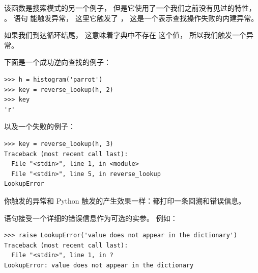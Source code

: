 该函数是搜索模式的另一个例子， 但是它使用了一个我们之前没有见过的特性， 。    语句 能触发异常， 这里它触发了 ， 这是一个表示查找操作失败的内建异常。

  
 
 


如果我们到达循环结尾， 这意味着字典中不存在  这个值， 所以我们触发一个异常。


下面是一个成功逆向查找的例子：

\begin{lstlisting}
>>> h = histogram('parrot')
>>> key = reverse_lookup(h, 2)
>>> key
'r'
\end{lstlisting}

%

以及一个失败的例子：

\begin{lstlisting}
>>> key = reverse_lookup(h, 3)
Traceback (most recent call last):
  File "<stdin>", line 1, in <module>
  File "<stdin>", line 5, in reverse_lookup
LookupError
\end{lstlisting}

%

你触发的异常和 Python 触发的产生效果一样：都打印一条回溯和错误信息。

  


 语句接受一个详细的错误信息作为可选的实参。    例如：

\begin{lstlisting}
>>> raise LookupError('value does not appear in the dictionary')
Traceback (most recent call last):
  File "<stdin>", line 1, in ?
LookupError: value does not appear in the dictionary
\end{lstlisting}

%

